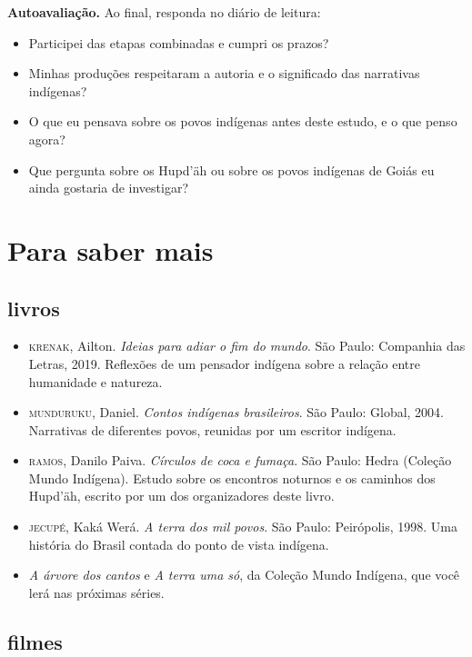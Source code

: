 \textbf{Autoavaliação.} Ao final, responda no diário de
leitura:

\begin{itemize}
\item Participei das etapas combinadas e cumpri os prazos?
\item Minhas produções respeitaram a autoria e o significado das
narrativas indígenas?
\item O que eu pensava sobre os povos indígenas antes deste estudo, e o
que penso agora?
\item Que pergunta sobre os Hupd'äh ou sobre os povos indígenas de Goiás
eu ainda gostaria de investigar?
\end{itemize}

\chapter{Para saber mais}
\begingroup\raggedright

\section{livros}

\begin{itemize}
\item \textsc{krenak}, Ailton. \textit{Ideias para adiar o fim do
mundo}. São Paulo: Companhia das Letras, 2019. Reflexões de um
pensador indígena sobre a relação entre humanidade e natureza.
\item \textsc{munduruku}, Daniel. \textit{Contos indígenas brasileiros}.
São Paulo: Global, 2004. Narrativas de diferentes povos, reunidas por um
escritor indígena.
\item \textsc{ramos}, Danilo Paiva. \textit{Círculos de coca e fumaça}.
São Paulo: Hedra (Coleção Mundo Indígena). Estudo sobre os encontros
noturnos e os caminhos dos Hupd'äh, escrito por um dos organizadores
deste livro.
\item \textsc{jecupé}, Kaká Werá. \textit{A terra dos mil povos}. São
Paulo: Peirópolis, 1998. Uma história do Brasil contada do ponto de
vista indígena.
\item \textit{A árvore dos cantos} e \textit{A terra uma só}, da Coleção
Mundo Indígena, que você lerá nas próximas séries.
\end{itemize}

\section{filmes}

